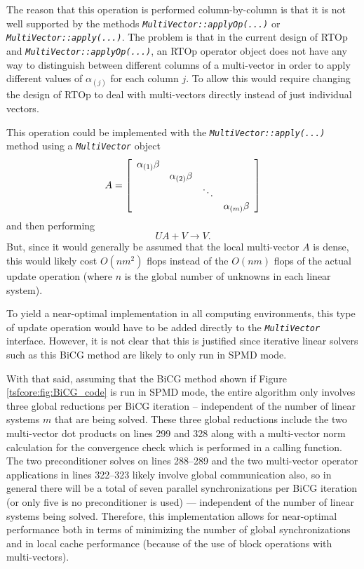 The reason that this operation is performed column-by-column is that
it is not well supported by the methods
\texttt{\textit{Multi\-Vector\-::applyOp(\-...)}} or
\texttt{\textit{Multi\-Vector\-::apply(\-...)}}.  The problem is that in
the current design of RTOp and
\texttt{\textit{Multi\-Vector\-::applyOp(\-...)}}, an RTOp operator object
does not have any way to distinguish between different columns of a
multi-vector in order to apply different values of $\alpha_{(j)}$ for
each column $j$.  To allow this would require changing the design of
RTOp to deal with multi-vectors directly instead of just individual
vectors.

This operation could be implemented with the
\texttt{\textit{Multi\-Vector\-::apply(\-...)}} method using a
\texttt{\textit{Multi\-Vector}} object
%
\[
A = {\bmat{cccc} \alpha_{(1)} \beta \\ & \alpha_{(2)} \beta \\ & & \ddots \\ & & & \alpha_{(m)} \beta \emat}
\]
%
and then performing
%
\[
U A + V \rightarrow V.
\]
%
But, since it would generally be assumed that the local multi-vector
$A$ is dense, this would likely cost $O(n m^2)$ flops instead of the
$O(n m)$ flops of the actual update operation (where $n$ is the global
number of unknowns in each linear system).

To yield a near-optimal implementation in all computing environments,
this type of update operation would have to be added directly to the
\texttt{\textit{Multi\-Vector}} interface.  However, it is not clear
that this is justified since iterative linear solvers such as this
BiCG method are likely to only run in SPMD mode.

With that said, assuming that the BiCG method shown if Figure
\ref{tsfcore:fig:BiCG_code} is run in SPMD mode, the entire
algorithm only involves three global reductions per BiCG iteration --
independent of the number of linear systems $m$ that are being solved.
These three global reductions include the two multi-vector dot
products on lines 299 and 328 along with a multi-vector norm
calculation for the convergence check which is performed in a
calling function.  The two preconditioner solves on lines 288--289
and the two multi-vector operator applications in lines 322--323
likely involve global communication also, so in general there will be
a total of seven parallel synchronizations per BiCG iteration (or only
five is no preconditioner is used) --- independent of the number of
linear systems being solved.  Therefore, this implementation allows
for near-optimal performance both in terms of minimizing the number of
global synchronizations and in local cache performance (because of the
use of block operations with multi-vectors).

